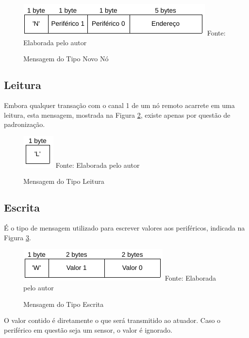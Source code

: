 {\begin{figure}[h!]
	\caption{Mensagem do Tipo Novo Nó}
	\centering
	\includegraphics[scale=0.5]{../images/mensagem_novo_no.png}
	\hspace{\linewidth}
	Fonte: Elaborada pelo autor
	\label{figura:message_new_node}
\end{figure}

\subsection{Leitura}
Embora qualquer transação com o canal 1 de um nó remoto acarrete em uma leitura, esta mensagem, mostrada na Figura
\ref{figura:message_read}, existe apenas por questão de padronização.

\begin{figure}[h!]
	\caption{Mensagem do Tipo Leitura}
	\centering
	\includegraphics[scale=0.5]{../images/mensagem_leitura.png}
	\hspace{\linewidth}
	Fonte: Elaborada pelo autor
	\label{figura:message_read}
\end{figure}

\subsection{Escrita}
É o tipo de mensagem utilizado para escrever valores aos periféricos, indicada na Figura
\ref{figura:message_esc}.

\begin{figure}[h!]
	\caption{Mensagem do Tipo Escrita}
	\centering
	\includegraphics[scale=0.5]{../images/mensagem_escrita.png}
	\hspace{\linewidth}
	Fonte: Elaborada pelo autor
	\label{figura:message_esc}
\end{figure}

O valor contido é diretamente o que será transmitido ao atuador. Caso o periférico em questão seja
um sensor, o valor é ignorado.

}
